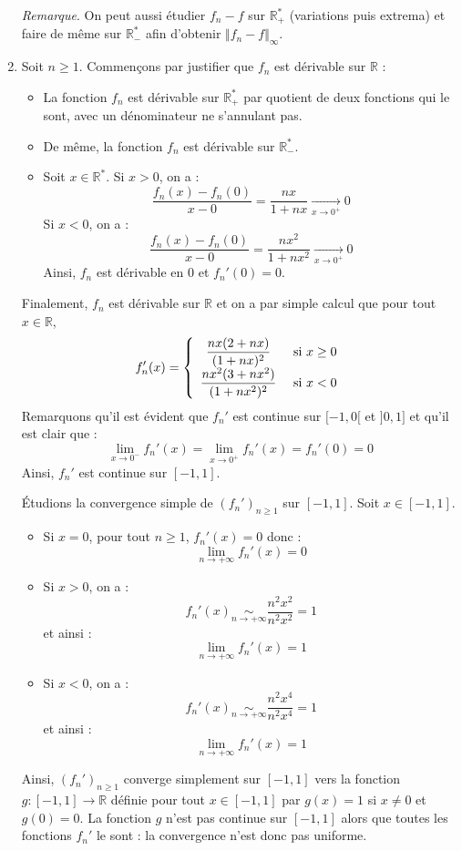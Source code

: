 \documentclass[a4paper,10pt]{report}
\begin{document}
\begin{enumerate}
\medskip

\noindent \textit{Remarque}. On peut aussi étudier $f_n-f$ sur $\mathbb{R}_+^{*}$ (variations puis extrema) et faire de même sur $\mathbb{R}_{-}^*$ afin d'obtenir $\Vert f_n-f \Vert_{\infty}$.

\medskip

\item Soit $n \geq 1$. Commençons par justifier que $f_n$ est dérivable sur $\mathbb{R}$ :
\begin{itemize}
\item La fonction $f_n$ est dérivable sur $\mathbb{R}_+^{*}$ par quotient de deux fonctions qui le sont, avec un dénominateur ne s'annulant pas.
\item De même, la fonction $f_n$ est dérivable sur $\mathbb{R}_{-}^{*}$.
\item Soit $x \in \mathbb{R}^*$. Si $x>0$, on a :
$$ \dfrac{f_n(x)-f_n(0)}{x-0} = \dfrac{nx}{1+nx} \underset{x \rightarrow 0^{+}}{\longrightarrow} 0$$
Si $x<0$, on a :
$$ \dfrac{f_n(x)-f_n(0)}{x-0} = \dfrac{nx^2}{1+nx^2} \underset{x \rightarrow 0^{+}}{\longrightarrow} 0$$
Ainsi, $f_n$ est dérivable en $0$ et $f_n'(0)=0$.
\end{itemize}

\medskip

\noindent Finalement, $f_n$ est dérivable sur $\mathbb{R}$ et on a par simple calcul que pour tout $x \in \mathbb{R}$,
$$ f_n'(x)  = \left\lbrace \begin{array}{cl}
\dfrac{nx(2+nx)}{(1+nx)^2} & \hbox{ si } x \geq 0 \\
\dfrac{nx^2(3+nx^2)}{(1+nx^2)^2} & \hbox{ si }x  < 0 \\
\end{array}\right.$$
Remarquons qu'il est évident que $f_n'$ est continue sur $[-1,0[$ et $]0,1]$ et qu'il est clair que :
$$ \lim_{x \rightarrow 0^{-}} f_n'(x) = \lim_{x \rightarrow 0^{+}} f_n'(x) = f_n'(0)=0$$
Ainsi, $f_n'$ est continue sur $[-1,1]$.

\medskip

\noindent Étudions la convergence simple de $(f_n')_{n \geq 1}$ sur $[-1,1]$. Soit $x \in [-1,1]$.
\begin{itemize}
\item Si $x=0$, pour tout $n \geq 1$, $f_n'(x)=0$ donc :
$$ \lim_{n \rightarrow + \infty} f_n'(x)=0$$
\item Si $x>0$, on a :
$$ f_n'(x) \underset{n \rightarrow + \infty}{\sim} \dfrac{n^2x^2}{n^2x^2} = 1$$
et ainsi :
$$ \lim_{n \rightarrow + \infty} f_n'(x)=1$$
\item Si $x<0$, on a :
$$ f_n'(x) \underset{n \rightarrow + \infty}{\sim} \dfrac{n^2x^4}{n^2x^4} = 1$$
et ainsi :
$$ \lim_{n \rightarrow + \infty} f_n'(x)=1$$
\end{itemize}
Ainsi, $(f_n')_{n \geq 1}$ converge simplement sur $[-1,1]$ vers la fonction $g : [-1,1] \rightarrow \mathbb{R}$ définie pour tout $x \in [-1,1]$ par $g(x)=1$ si $x \neq 0$ et $g(0)=0$. La fonction $g$ n'est pas continue sur $[-1,1]$ alors que toutes les fonctions $f_n'$ le sont : la convergence n'est donc pas uniforme.
\end{enumerate}
\end{document}
